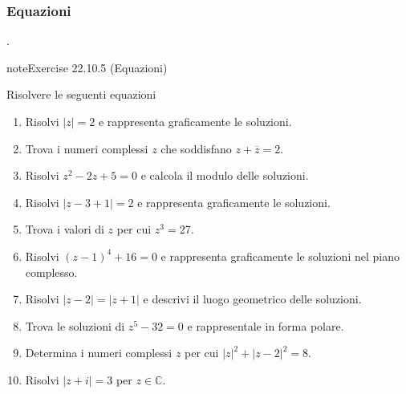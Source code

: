 \documentclass[letterpaper,10pt,italian]{jupyterBook}
\begin{document}
\subsubsection{Equazioni}
\label{\detokenize{ch/algebra/complex-algebra-problems:equazioni}}\label{\detokenize{ch/algebra/complex-algebra-problems:math-hs-algebra-complex-problems-equations-eq}}
\sphinxAtStartPar
{\hyperref[\detokenize{ch/algebra/complex-algebra-sol:math-hs-algebra-complex-sol-equations-eq-sol}]{}}.
 \label{exercise:ch/algebra/complex-algebra-problems-exercise-4}

\begin{sphinxadmonition}{note}{Exercise 22.10.5 (Equazioni)}



\sphinxAtStartPar
Risolvere le seguenti equazioni
\begin{enumerate}
%
\item {} 
\sphinxAtStartPar
Risolvi \(|z| = 2\) e rappresenta graficamente le soluzioni.

\item {} 
\sphinxAtStartPar
Trova i numeri complessi \(z\) che soddisfano \(z + \overline{z} = 2\).

\item {} 
\sphinxAtStartPar
Risolvi \(z^2 - 2z + 5 = 0\) e calcola il modulo delle soluzioni.

\item {} 
\sphinxAtStartPar
Risolvi \(|z - 3 + 1| = 2\) e rappresenta graficamente le soluzioni.

\item {} 
\sphinxAtStartPar
Trova i valori di \(z\) per cui \(z^3 = 27\).

\item {} 
\sphinxAtStartPar
Risolvi \((z-1)^4 + 16 = 0\) e rappresenta graficamente le soluzioni nel piano complesso.

\item {} 
\sphinxAtStartPar
Risolvi \(|z - 2| = |z + 1|\) e descrivi il luogo geometrico delle soluzioni.

\item {} 
\sphinxAtStartPar
Trova le soluzioni di \(z^5 - 32 = 0\) e rappresentale in forma polare.

\item {} 
\sphinxAtStartPar
Determina i numeri complessi \(z\) per cui \(|z|^2 + |z - 2|^2 = 8\).

\item {} 
\sphinxAtStartPar
Risolvi \(|z + i| = 3\) per \(z \in \mathbb{C}\).


\end{enumerate}
\end{sphinxadmonition}
\end{document}
